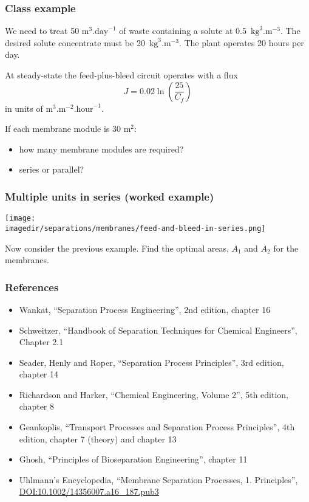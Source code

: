 \begin{frame}\frametitle{Class example}
	We need to treat 50 $\text{m}^3\text{.day}^{-1}$ of waste containing a solute at 0.5~$\text{kg}^3\text{.m}^{-3}$. The desired solute concentrate must be 20~$\text{kg}^3\text{.m}^{-3}$. The plant operates 20 hours per day.
	
	\vspace{12pt}
	At steady-state the feed-plus-bleed circuit operates with a flux 
	\[
		J = 0.02 \ln \left(\frac{25}{C_f} \right)
	\]
	in units of $\text{m}^3.\text{m}^{-2}.\text{hour}^{-1}$.
	
	\vspace{12pt}
	If each membrane module is 30 m$^2$:	
	\begin{itemize}
		\item	how many membrane modules are required?
		\item	series or parallel?
	\end{itemize}
\end{frame}

\begin{frame}\frametitle{Multiple units in series (worked example)}
	\begin{center}
		\texttt{[image: \\imagedir/separations/membranes/feed-and-bleed-in-series.png]}
	\end{center}
	
	Now consider the previous example. Find the optimal areas, $A_1$ and $A_2$ for the membranes.
	
	
\end{frame}


\begin{frame}\frametitle{References}
	\begin{itemize}
		\item	Wankat, ``Separation Process Engineering'', 2nd edition, chapter 16
		\item	Schweitzer, ``Handbook of Separation Techniques for Chemical Engineers'', Chapter 2.1
		\item	Seader, Henly and Roper, ``Separation Process Principles'', 3rd edition, chapter 14
		\item	Richardson and Harker, ``Chemical Engineering, Volume 2'', 5th edition, chapter 8
		\item	Geankoplis, ``Transport Processes and Separation Process Principles'', 4th edition, chapter 7 (theory) and chapter 13
		\item	Ghosh, ``Principles of Bioseparation Engineering'', chapter 11 
		\item	Uhlmann's Encyclopedia, ``Membrane Separation Processes, 1. Principles'',  \href{http://dx.doi.org/10.1002/14356007.a16_187.pub3}{DOI:10.1002/14356007.a16\_187.pub3}
	\end{itemize}
\end{frame}

